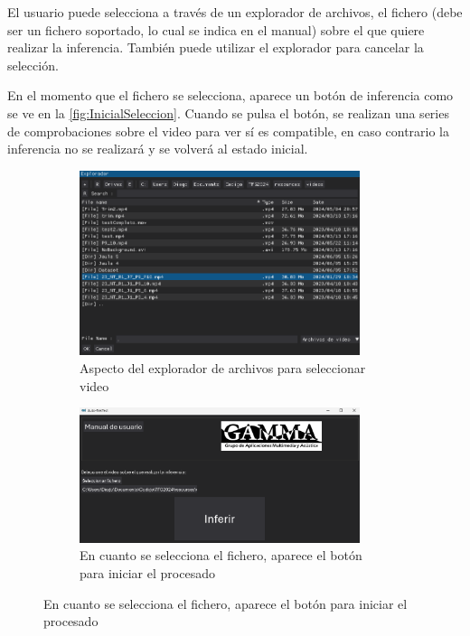 \begin{itemize}
    El usuario puede selecciona a través de un explorador de archivos, el fichero (debe ser un fichero soportado, lo cual se indica en el manual) sobre el que quiere realizar la inferencia. También puede utilizar el explorador 
    para cancelar la selección.
    
    En el momento que el fichero se selecciona, aparece un botón de inferencia como se ve en la \autoref{fig:InicialSeleccion}. Cuando se pulsa el botón, se realizan una series de comprobaciones sobre el video para ver sí es 
    compatible, en caso contrario la inferencia no se realizará y se volverá al estado inicial.

    \begin{figure}[H]
        \centering
        \begin{subfigure}{0.8\textwidth}
            \centering
            \includegraphics[width=0.9\textwidth]{images/6/6.5/Explorador.png}
            \caption{Aspecto del explorador de archivos para seleccionar video}
        \end{subfigure}
        \begin{subfigure}{0.8\textwidth}
            \centering
            \includegraphics[width=0.9\textwidth]{images/6/6.5/InicialSeleccionado.png}
            \caption{En cuanto se selecciona el fichero, aparece el botón para iniciar el procesado}

\end{subfigure}
\end{figure}
\end{itemize}
